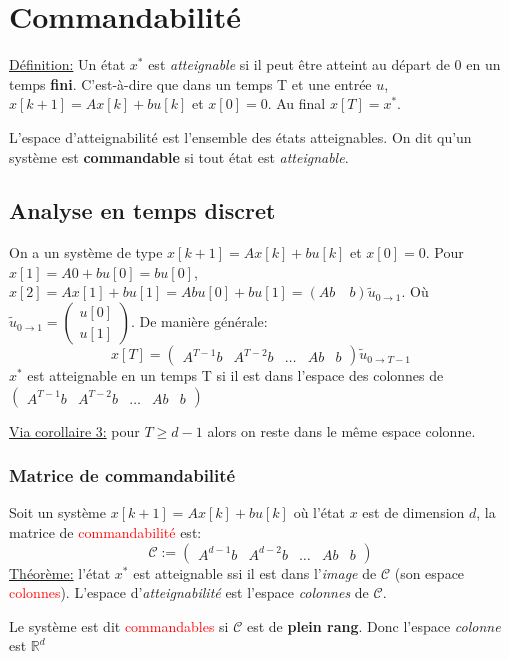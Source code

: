 \documentclass{report}
\begin{document}
\section{Commandabilité}
\noindent 
\underline{Définition:} Un état $x^{\ast}$ est \textit{atteignable} si il peut être atteint au départ de 0 en un temps \textbf{fini}. C'est-à-dire que dans un temps T et une entrée $u$, $x[k+1] = Ax[k] + bu[k]$ et $x[0] = 0$. Au final $x[T] = x^{\ast}$.\par
L'espace d'atteignabilité est l'ensemble des états atteignables. On dit qu'un système est \textbf{commandable} si tout état est \textit{atteignable}.

\subsection{Analyse en temps discret}
On a un système de type $x[k+1] = A x[k] + bu[k]$ et $x[0] = 0$. Pour $x[1] = A 0 + bu[0] = bu[0]$, $x[2] = Ax[1] + bu[1] = Abu[0] +bu[1] = (Ab \quad b) \tilde{u}_{0 \rightarrow 1} $. Où $\tilde{u}_{0 \rightarrow 1} = \begin{pmatrix}
u[0]\\
u[1]
\end{pmatrix}
$. De manière générale:
\begin{equation}
x[T] = \begin{pmatrix}
A^{T-1} b & A^{T-2} b & \hdots & Ab & b
\end{pmatrix} \tilde{u}_{0 \rightarrow T-1}
\end{equation}
$x^{\ast}$ est atteignable en un temps T si il est dans l'espace des colonnes de $\begin{pmatrix}
A^{T-1} b & A^{T-2} b & \hdots & Ab & b
\end{pmatrix}$\par \noindent
\underline{Via corollaire 3:} pour $T \geqslant d-1$ alors on reste dans le même espace colonne.

\subsubsection{Matrice de commandabilité}
Soit un système $x[k+1] = Ax[k] + bu[k]$ où l'état $x$ est de dimension $d$, la matrice de \textcolor{red}{commandabilité} est:
\begin{equation}
\mathcal{C} := \begin{pmatrix}
A^{d-1} b & A^{d-2} b & \hdots & Ab & b
\end{pmatrix}
\end{equation}
\noindent \underline{Théorème:} l'état $x^{\ast}$ est atteignable ssi il est dans l'\textit{image} de $\mathcal{C}$ (son espace \textcolor{red}{colonnes}). L'espace d'\textit{atteignabilité} est l'espace \textit{colonnes} de $\mathcal{C}$.\par 
\noindent Le système est dit \textcolor{red}{commandables} si $\mathcal{C}$ est de \textbf{plein rang}. Donc l'espace \textit{colonne} est $\mathbb{R}^d$
\end{document}
